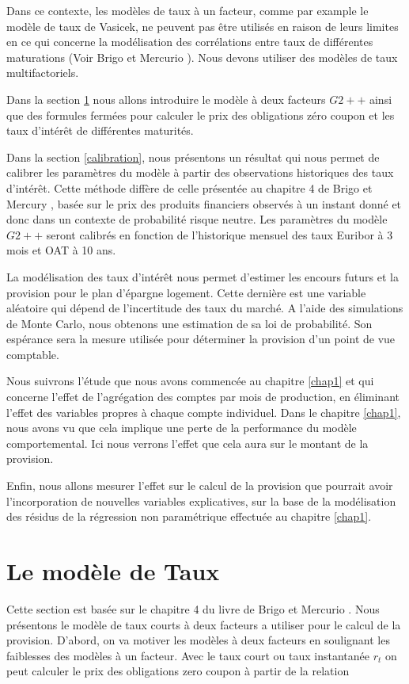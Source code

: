 \documentclass[12pt, a4paper]{book}
\begin{document}
Dans ce contexte, les modèles de taux à un facteur, comme par example le modèle de taux de Vasicek, ne peuvent pas être utilisés en raison de leurs limites en ce qui concerne la modélisation des corrélations entre taux de différentes maturations (Voir Brigo et Mercurio \cite{BM}). Nous devons utiliser des modèles de taux multifactoriels.

Dans la section \ref{SmodeleTaux} nous allons introduire le modèle à deux facteurs $G2++$ ainsi que des formules fermées pour calculer le prix des obligations zéro coupon et les taux d'intérêt de différentes maturités.

Dans la section \ref{calibration}, nous présentons un résultat qui nous permet de calibrer les paramètres du modèle à partir des observations historiques des taux d'intérêt. Cette méthode diffère de celle présentée au chapitre 4 de Brigo et Mercury \cite{BM}, basée sur le prix des produits financiers observés à un instant donné et donc dans un contexte de probabilité risque neutre. Les paramètres du modèle $G2++$ seront calibrés en fonction de l'historique mensuel des taux Euribor à 3 mois et OAT à 10 ans.

La modélisation des taux d'intérêt nous permet d'estimer les encours futurs et la provision pour le plan d'épargne logement. Cette dernière est une variable aléatoire qui dépend de l'incertitude des taux du marché. A l'aide des simulations de Monte Carlo, nous obtenons une estimation de sa loi de probabilité. Son espérance sera la mesure utilisée pour déterminer la provision d'un point de vue comptable. 

Nous suivrons l'étude que nous avons commencée au chapitre \ref{chap1} et qui concerne l'effet de l'agrégation  des comptes par mois de production, en éliminant l'effet des variables propres à chaque compte individuel. Dans le chapitre \ref{chap1}, nous avons vu que cela implique une perte de la performance du modèle comportemental. Ici nous verrons l'effet que cela aura sur le montant de la provision.

Enfin, nous allons mesurer l'effet sur le calcul de la provision que pourrait avoir l'incorporation de nouvelles variables explicatives, sur la base de la modélisation des résidus de la régression non paramétrique effectuée au chapitre \ref{chap1}.

\section{Le modèle de Taux}
\label{SmodeleTaux}
Cette section est basée sur le chapitre 4 du livre de Brigo et Mercurio \cite{BM}. Nous présentons le modèle de taux courts à deux facteurs a utiliser pour le calcul de la provision. D'abord, on va motiver les modèles à deux facteurs en soulignant les faiblesses des modèles à un facteur. Avec le taux court ou taux instantanée $r_t$ on peut calculer le prix des obligations zero coupon à partir de la relation 
\end{document}
